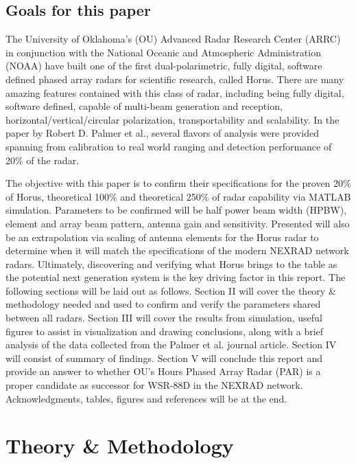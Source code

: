 \documentclass[conference]{IEEEtran}
\begin{document}
\subsection{Goals for this paper}
The University of Oklahoma's (OU) Advanced Radar Research Center (ARRC) in conjunction with the National Oceanic and Atmospheric Administration (NOAA) have built one of the first dual-polarimetric, fully digital, software defined phased array radars for scientific research, called Horus\cite{b1}. There are many amazing features contained with this class of radar, including being fully digital, software defined, capable of multi-beam generation and reception, horizontal/vertical/circular polarization, transportability and scalability. In the paper by Robert D. Palmer et al., several flavors of analysis were provided spanning from calibration to real world ranging and detection performance of 20\% of the radar. 
\par The objective with this paper is to confirm their specifications for the proven 20\% of Horus, theoretical 100\% and theoretical 250\% of radar capability via MATLAB simulation. Parameters to be confirmed will be half power beam width (HPBW), element and array beam pattern, antenna gain and sensitivity. Presented will also be an extrapolation via scaling of antenna elements for the Horus radar to determine when it will match the specifications of the modern NEXRAD network radars. Ultimately, discovering and verifying what Horus brings to the table as the potential next generation system is the key driving factor in this report. The following sections will be laid out as follows. Section II will cover the theory \& methodology needed and used to confirm and verify the parameters shared between all radars. Section III will cover the results from simulation, useful figures to assist in visualization and drawing conclusions, along with a brief analysis of the data collected from the Palmer et al. journal article. Section IV will consist of summary of findings. Section V will conclude this  report and provide an answer to whether OU's Hours Phased Array Radar (PAR) is a proper candidate as successor for WSR-88D in the NEXRAD network. Acknowledgments, tables, figures and references will be at the end.
\section{Theory \& Methodology}
\end{document}
